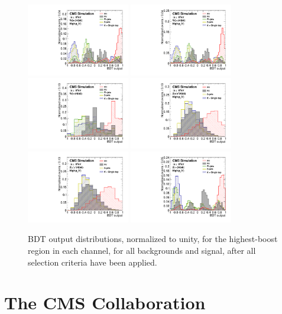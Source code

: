 \documentclass[11pt,twoside,a4paper,cmspaper,final,collab]{cms-tdr}
\begin{document}
\begin{figure}[htbp]
\centering
    \includegraphics[width=0.4\textwidth]{comparison_BDT_Wln_ch1_Wenu3_PostFit_s}
    \includegraphics[width=0.4\textwidth]{comparison_BDT_Wln_ch2_Wmunu3_PostFit_s}
    \includegraphics[width=0.4\textwidth]{comparison_BDT_Wtn_Wtn_PostFit_s}
    \includegraphics[width=0.4\textwidth]{comparison_BDT_Zll_ZeeHighPt_PostFit_s}
    \includegraphics[width=0.4\textwidth]{comparison_BDT_Zll_ZmmHighPt_PostFit_s}
    \includegraphics[width=0.4\textwidth]{comparison_BDT_Znn_HighPt_ZnunuHighPt_8TeV_PostFit_s}
    \caption{BDT output distributions, normalized to unity, for the highest-boost region in each
    channel, for all backgrounds and signal, after all selection
    criteria have been applied.}
    \label{fig:BDT_norm}
\end{figure}
\cleardoublepage \appendix\section{The CMS Collaboration \label{app:collab}}\begin{sloppypar}\end{sloppypar}
\end{document}
